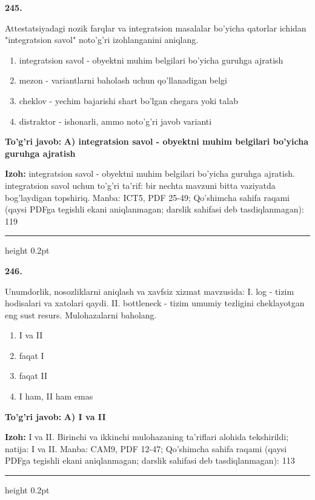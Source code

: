\documentclass[10pt,a4paper]{article}
\begin{document}
{\bfseries\sffamily\color{ink} 245.}
\par
Attestatsiyadagi nozik farqlar va integratsion masalalar bo'yicha qatorlar ichidan "integratsion savol" noto'g'ri izohlanganini aniqlang.
\begin{enumerate}[label=\Alph*),leftmargin=9mm]
\item integratsion savol - obyektni muhim belgilari bo'yicha guruhga ajratish
\item mezon - variantlarni baholash uchun qo'llanadigan belgi
\item cheklov - yechim bajarishi shart bo'lgan chegara yoki talab
\item distraktor - ishonarli, ammo noto'g'ri javob varianti
\end{enumerate}
\begin{tcolorbox}[enhanced,breakable,colback=teal!4,colframe=teal!60!black,boxrule=0.45pt,arc=1.2mm,left=2.7mm,right=2.7mm,top=1.8mm,bottom=1.8mm,before skip=2mm,after skip=2mm]
{\bfseries\sffamily\color{teal}To'g'ri javob:} \textbf{A) integratsion savol - obyektni muhim belgilari bo'yicha guruhga ajratish}
\par\smallskip
{\bfseries Izoh:} integratsion savol - obyektni muhim belgilari bo'yicha guruhga ajratish. integratsion savol uchun to'g'ri ta'rif: bir nechta mavzuni bitta vaziyatda bog'laydigan topshiriq. Manba: ICT5, PDF 25-49; Qo'shimcha sahifa raqami (qaysi PDFga tegishli ekani aniqlanmagan; darslik sahifasi deb tasdiqlanmagan): 119
\end{tcolorbox}
\vspace{2mm}\hrule height 0.2pt\vspace{3mm}

{\bfseries\sffamily\color{ink} 246.}
\par
Unumdorlik, nosozliklarni aniqlash va xavfsiz xizmat mavzusida: I. log - tizim hodisalari va xatolari qaydi. II. bottleneck - tizim umumiy tezligini cheklayotgan eng sust resurs. Mulohazalarni baholang.
\begin{enumerate}[label=\Alph*),leftmargin=9mm]
\item I va II
\item faqat I
\item faqat II
\item I ham, II ham emas
\end{enumerate}
\begin{tcolorbox}[enhanced,breakable,colback=teal!4,colframe=teal!60!black,boxrule=0.45pt,arc=1.2mm,left=2.7mm,right=2.7mm,top=1.8mm,bottom=1.8mm,before skip=2mm,after skip=2mm]
{\bfseries\sffamily\color{teal}To'g'ri javob:} \textbf{A) I va II}
\par\smallskip
{\bfseries Izoh:} I va II. Birinchi va ikkinchi mulohazaning ta'riflari alohida tekshirildi; natija: I va II. Manba: CAM9, PDF 12-47; Qo'shimcha sahifa raqami (qaysi PDFga tegishli ekani aniqlanmagan; darslik sahifasi deb tasdiqlanmagan): 113
\end{tcolorbox}
\vspace{2mm}\hrule height 0.2pt\vspace{3mm}
\end{document}
